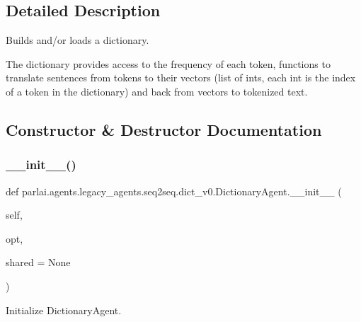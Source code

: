 \subsection{Detailed Description}
\begin{DoxyVerb}Builds and/or loads a dictionary.

The dictionary provides access to the frequency of each token, functions to
translate sentences from tokens to their vectors (list of ints, each int is the
index of a token in the dictionary) and back from vectors to tokenized text.
\end{DoxyVerb}
 

\subsection{Constructor \& Destructor Documentation}
\mbox{\label{classparlai_1_1agents_1_1legacy__agents_1_1seq2seq_1_1dict__v0_1_1DictionaryAgent_ace91e7215f1a4688abaa3235e2c19d56}} 
\subsubsection{\texorpdfstring{\+\_\+\+\_\+init\+\_\+\+\_\+()}{\_\_init\_\_()}}
{\footnotesize\ttfamily def parlai.\+agents.\+legacy\+\_\+agents.\+seq2seq.\+dict\+\_\+v0.\+Dictionary\+Agent.\+\_\+\+\_\+init\+\_\+\+\_\+ (\begin{DoxyParamCaption}\item[{}]{self,  }\item[{}]{opt,  }\item[{}]{shared = {\ttfamily None} }\end{DoxyParamCaption})}

\begin{DoxyVerb}Initialize DictionaryAgent.
\end{DoxyVerb}
 

